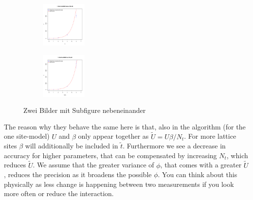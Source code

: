 \begin{figure}
	\begin{subfigure}[c]{0.5\textwidth}
		
		\includegraphics[width=0.25\textwidth]{figs/plot_Z1U}
		
	\end{subfigure}
	\begin{subfigure}[c]{0.5\textwidth}
		\includegraphics[width=0.25\textwidth]{figs/plot_Z1b}
	\end{subfigure}
	\caption{Zwei Bilder mit Subfigure nebeneinander}
\end{figure}
The reason why they behave the same here is that, also in the algorithm (for the one site-model) $U$ and $\beta$ only appear together as $\tilde{U}=U\beta/N_t$. For more lattice sites $\beta$ will additionally be included in $\tilde{t}$.
Furthermore we see a decrease in accuracy for higher parameters, that can be compensated by increasing $N_t$, which reduces $\tilde{U}$. We assume that the greater variance of $\phi$, that comes with a greater $\tilde{U}$, reduces the precision as it broadens the possible $\phi$.
You can think about this physically as less change is happening between two measurements if you look more often or reduce the interaction.
